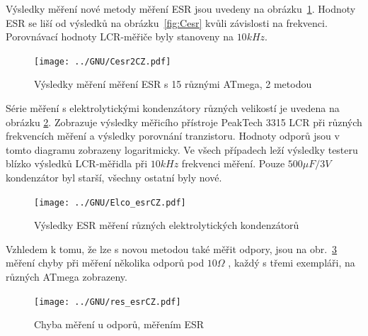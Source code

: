 Výsledky měření nové metody měření ESR jsou uvedeny na obrázku~\ref{fig:Cesr2}.
Hodnoty ESR se liší od výsledků na obrázku~\ref{fig:Cesr} kvůli závislosti na frekvenci.
Porovnávací hodnoty  LCR-měřiče byly stanoveny na \(10kHz\).

\begin{figure}[H]
\centering
 \texttt{[image: ../GNU/Cesr2CZ.pdf]}
\caption{Výsledky měření měření ESR s 15 různými ATmega, 2 metodou}
\label{fig:Cesr2}
\end{figure}

Série měření s elektrolytickými kondenzátory různých velikostí je uvedena na obrázku \ref{fig:ElcoESR}.
Zobrazuje výsledky měřicího přístroje PeakTech 3315 LCR při různých frekvencích měření a
výsledky porovnání tranzistoru.
Hodnoty odporů jsou v tomto diagramu zobrazeny logaritmicky.
Ve všech případech leží výsledky testeru blízko výsledků LCR-měřidla při \(10kHz\) frekvenci měření. 
Pouze \(500\mu F/3V\) kondenzátor byl starší, všechny ostatní byly nové.

\begin{figure}[H]
\centering
\texttt{[image: ../GNU/Elco\_esrCZ.pdf]}
\caption{Výsledky ESR měření různých elektrolytických kondenzátorů}
\label{fig:ElcoESR}
\end{figure}

Vzhledem k tomu, že lze s novou metodou také měřit odpory, jsou na obr.~\ref{fig:res_esr} měření chyby při měření několika odporů pod \(10\Omega\) , každý s třemi exempláři, na různých ATmega zobrazeny.  

\begin{figure}[H]
\centering
\texttt{[image: ../GNU/res\_esrCZ.pdf]}
\caption{Chyba měření u odporů, měřením ESR}
\label{fig:res_esr}
\end{figure}

